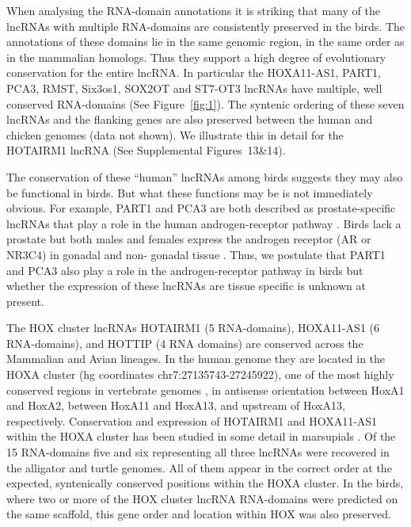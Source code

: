 \documentclass[10pt]{bmc_article}
\newenvironment{bmcformat}{\begin{raggedright}\baselineskip20pt\sloppy\setboolean{publ}{false}}{\end{raggedright}\baselineskip20pt\sloppy}
\begin{document}
\begin{bmcformat}
When analysing the RNA-domain annotations it is striking that many of
the lncRNAs with multiple RNA-domains are consistently preserved in
the birds. The annotations of these domains lie in the same genomic
region, in the same order as in the mammalian homologs. Thus they
support a high degree of evolutionary conservation for the entire
lncRNA. In particular the HOXA11-AS1, PART1, PCA3, RMST, Six3os1,
SOX2OT and ST7-OT3 lncRNAs have multiple, well conserved RNA-domains
(See Figure~\ref{fig:1}). The syntenic ordering of these seven lncRNAs
and the flanking genes are also preserved between the human and
chicken genomes (data not shown). We illustrate this in detail for the
HOTAIRM1 lncRNA (See Supplemental Figures~13\&14).



The conservation of these ``human'' lncRNAs among birds suggests they
may also be functional in birds. But what these functions may be is not
immediately obvious. For example, PART1 and PCA3 are both described as
prostate-specific lncRNAs that play a role in the human
androgen-receptor pathway
\cite{Bussemakers:1999,Lin:2000,Ferreira:2012}. Birds lack a prostate
but both males and females express the androgen receptor (AR or NR3C4)
in gonadal and non- gonadal tissue
\cite{Yoshimura:1993,Veney:2004,Fuxjager:2012,Leska:2012}. Thus, we
postulate that PART1 and PCA3 also play a role in the
androgen-receptor pathway in birds but whether the expression of these
lncRNAs are tissue specific is unknown at present.

The HOX cluster lncRNAs HOTAIRM1 (5 RNA-domains), HOXA11-AS1 (6
RNA-domains), and HOTTIP (4 RNA domains) are conserved across the
Mammalian and Avian lineages. In the human genome they are located in
the HOXA cluster (hg coordinates chr7:27135743-27245922), one of the
most highly conserved regions in vertebrate genomes
\cite{PascualAnaya:13}, in antisense orientation between HoxA1 and
HoxA2, between HoxA11 and HoxA13, and upstream of HoxA13,
respectively. Conservation and expression of HOTAIRM1 and HOXA11-AS1
within the HOXA cluster has been studied in some detail in marsupials
\cite{Yu:12}.  Of the 15 RNA-domains five and six representing all
three lncRNAs were recovered in the alligator and turtle genomes. All
of them appear in the correct order at the expected, syntenically
conserved positions within the HOXA cluster.  In the birds, where two
or more of the HOX cluster lncRNA RNA-domains were predicted on the
same scaffold, this gene order and location within HOX was also
preserved.


\end{bmcformat}
\end{document}
